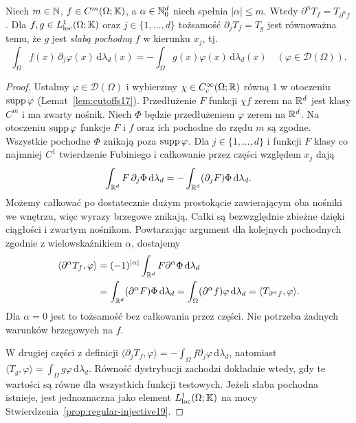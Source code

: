 \begin{stwierdzenie}
\label{prop:classical-weak20}
Niech $m\in\mathbb N$, $f\in C^m(\Omega;\mathbb K)$, a $\alpha\in\mathbb N_0^d$
niech spełnia $|\alpha|\le m$. Wtedy
$\partial^\alpha T_f=T_{\partial^\alpha f}$.
Dla $f,g\in L^1_{\mathrm{loc}}(\Omega;\mathbb K)$
oraz $j\in\{1,\ldots,d\}$ tożsamość
$\partial_jT_f=T_g$ jest równoważna temu, że $g$ jest
\emph{słabą pochodną} $f$ w kierunku $x_j$, tj.
\[
 \int_\Omega f(x)\,\partial_j\varphi(x)\,\mathrm d\lambda_d(x)
 =-\int_\Omega g(x)\varphi(x)\,\mathrm d\lambda_d(x)
 \quad(\varphi\in\mathcal D(\Omega)).
\]
\end{stwierdzenie}
\begin{proof}
Ustalmy $\varphi\in\mathcal D(\Omega)$ i wybierzmy
$\chi\in C_c^\infty(\Omega;\mathbb R)$ równą $1$ w otoczeniu
$\operatorname{supp}\varphi$ (Lemat~\ref{lem:cutoffs17}).
Przedłużenie $F$ funkcji $\chi f$ zerem na $\mathbb R^d$
jest klasy $C^m$ i ma zwarty nośnik. Niech $\Phi$ będzie
przedłużeniem $\varphi$ zerem na $\mathbb R^d$.
Na otoczeniu $\operatorname{supp}\varphi$ funkcje $F$ i $f$ oraz ich pochodne
do rzędu $m$ są zgodne. Wszystkie pochodne $\Phi$
znikają poza $\operatorname{supp}\varphi$.
Dla $j\in\{1,\ldots,d\}$ i funkcji $F$ klasy co najmniej $C^1$
twierdzenie Fubiniego i całkowanie przez części względem $x_j$
dają
\[
\int_{\mathbb R^d}F\,\partial_j\Phi\,\mathrm d\lambda_d
=-\int_{\mathbb R^d}(\partial_jF)\Phi\,\mathrm d\lambda_d.
\]
Możemy całkować po dostatecznie dużym prostokącie zawierającym
oba nośniki we wnętrzu, więc wyrazy brzegowe znikają.
Całki są bezwzględnie zbieżne dzięki ciągłości i zwartym nośnikom.
Powtarzając argument dla kolejnych pochodnych zgodnie z
wielowskaźnikiem $\alpha$, dostajemy
\[
\begin{aligned}
\langle\partial^\alpha T_f,\varphi\rangle
&=(-1)^{|\alpha|}\int_{\mathbb R^d}F\partial^\alpha\Phi\,\mathrm d\lambda_d\\
&=\int_{\mathbb R^d}(\partial^\alpha F)\Phi\,\mathrm d\lambda_d
=\int_\Omega(\partial^\alpha f)\varphi\,\mathrm d\lambda_d
=\langle T_{\partial^\alpha f},\varphi\rangle.
\end{aligned}
\]
Dla $\alpha=0$ jest to tożsamość bez całkowania przez części.
Nie potrzeba żadnych warunków brzegowych na $f$.

W drugiej części z definicji
$\langle\partial_jT_f,\varphi\rangle
=-\int_\Omega f\partial_j\varphi\,\mathrm d\lambda_d$,
natomiast $\langle T_g,\varphi\rangle
=\int_\Omega g\varphi\,\mathrm d\lambda_d$.
Równość dystrybucji zachodzi dokładnie wtedy, gdy te wartości
są równe dla wszystkich funkcji testowych.
Jeżeli słaba pochodna istnieje, jest jednoznaczna jako element
$L^1_{\mathrm{loc}}(\Omega;\mathbb K)$ na mocy
Stwierdzenia~\ref{prop:regular-injective19}.
\end{proof}

